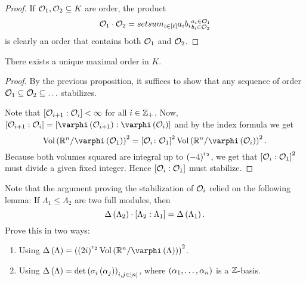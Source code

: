 \documentclass[11pt]{karticle}
\begin{document}
\begin{proof}
If $\mathcal{O}_1, \mathcal{O}_2 \subseteq K$ are order, the product
\[\mathcal{O}_1 \cdot \mathcal{O}_2 = \\set{sum_{i \in [\ell]} a_i b_i}{\substack{a_i \in \mathcal{O}_1 \\ b_i \in \mathcal{O}_2}}\]
is clearly an order that contains both $\mathcal{O}_1$ and $\mathcal{O}_2$.
\end{proof}

\begin{theorem}
There exists a unique maximal order in $K$.
\end{theorem}

\begin{proof}
By the previous proposition, it suffices to show that any sequence of order $\mathcal{O}_1 \subseteq \mathcal{O}_2 \subseteq \ldots$ stabilizes.

Note that $\left[ \mathcal{O}_{i+1} : \mathcal{O}_{i} \right] < \infty$ for all $i \in \mathbb{Z}_+$. Now, $\brs{\mcal{O}_{i+1} : \mcal{O}_i} = \brs{\varphi\prs{\mcal{O}_{i+1}} : \varphi\prs{\mcal{O}_i}}$ and by the index formula we get
\[\mrm{Vol}\prs{\mbb{R}^n / \varphi\prs{\mcal{O}_1}}^2 = \brs{\mcal{O}_i \colon \mcal{O}_1}^2 \mrm{Vol}\prs{\mbb{R}^n / \varphi\prs{\mcal{O}_i}}^2 \text{.} \]
Because both volumes squared are integral up to $\left( -4 \right)^{r_2}$, we get that $\left[ \mathcal{O}_i : \mathcal{O}_1 \right]^2$ must divide a given fixed integer. Hence $\left[ \mathcal{O}_i : \mathcal{O}_1 \right]$ must stabilize.
\end{proof}

\begin{exercise}
Note that the argument proving the stabilization of $\mathcal{O}_i$ relied on the following lemma:
If $\Lambda_1 \leq \Lambda_2$ are two full modules, then \[\Delta\left( \Lambda_2 \right) \cdot \left[ \Lambda_2 : \Lambda_1 \right] = \Delta\left( \Lambda_1 \right)\text{.}\]
Prove this in two ways:
\begin{enumerate}
\item Using $\Delta\prs{\Lambda} = \prs{\prs{2i}^{r_2} \mrm{Vol}\prs{\mbb{R}^n / \varphi\prs{\Lambda}}}^2$.
\item Using $\Delta\left( \Lambda \right) = \det\left( \sigma_i\left( \alpha_j \right) \right)_{i,j \in [n]}$, where $\left( \alpha_1, \ldots, \alpha_n \right)$ is a $\mathbb{Z}$-basis.
\end{enumerate}
\end{exercise}
\end{document}
